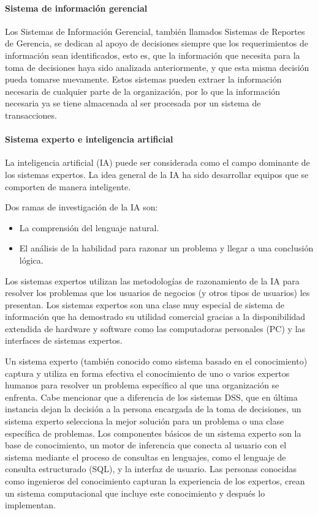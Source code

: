 \paragraph{Sistema de información gerencial}

Los Sistemas de Información Gerencial, también llamados Sistemas de Reportes de Gerencia, se dedican al apoyo de decisiones siempre que los requerimientos de información sean identificados, esto es, que la información que necesita para la toma de decisiones haya sido analizada anteriormente, y que esta misma decisión pueda tomarse nuevamente\cite{kendall2005analisis}. Estos sistemas pueden extraer la información necesaria de cualquier parte de la organización, por lo que la información necesaria ya se tiene almacenada al ser procesada por un sistema de transacciones. 


\paragraph{Sistema experto e inteligencia artificial }
La inteligencia artificial (IA) puede ser considerada como el campo dominante de los sistemas expertos. La idea general de la IA ha sido desarrollar equipos que se comporten de manera inteligente\cite{kendall2005analisis}. 

Dos ramas de investigación de la IA son: 

\begin{itemize}

\item La comprensión del lenguaje natural. 
\item El análisis de la habilidad para razonar un problema y llegar a una conclusión lógica. 

\end{itemize}

Los sistemas expertos utilizan las metodologías de razonamiento de la IA para resolver los problemas que los usuarios de negocios (y otros tipos de usuarios) les presentan. Los sistemas expertos son una clase muy especial de sistema de información que ha demostrado su utilidad comercial gracias a la disponibilidad extendida de hardware y software como las computadoras personales (PC) y las interfaces de sistemas expertos.


Un sistema experto (también conocido como sistema basado en el conocimiento) captura y utiliza en forma efectiva el conocimiento de uno o varios expertos humanos para resolver un problema específico al que una organización se enfrenta. Cabe mencionar que a diferencia de los sistemas DSS, que en última instancia dejan la decisión a la persona encargada de la toma de decisiones, un sistema experto selecciona la mejor solución para un problema o una clase específica de problemas. Los componentes básicos de un sistema experto son la base de conocimiento, un motor de inferencia que conecta al usuario con el sistema mediante el proceso de consultas en lenguajes, como el lenguaje de consulta estructurado (SQL), y la interfaz de usuario. Las personas conocidas como ingenieros del conocimiento capturan la experiencia de los expertos, crean un sistema computacional que incluye este conocimiento y después lo implementan\cite{kendall2005analisis}.



